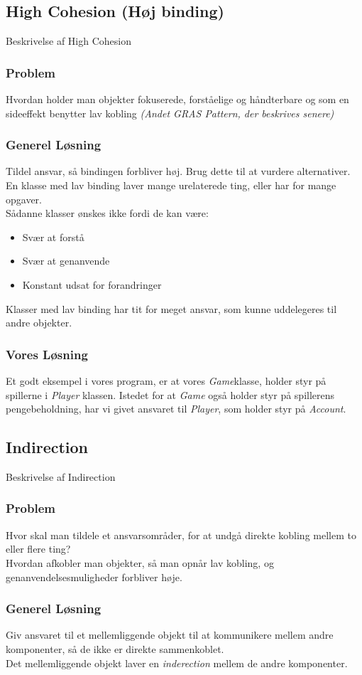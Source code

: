 \subsection{High Cohesion (Høj binding)}
Beskrivelse af High Cohesion
\subsubsection*{Problem}
Hvordan holder man objekter fokuserede, forståelige og håndterbare og som en sideeffekt benytter lav kobling \textit{(Andet GRAS Pattern, der beskrives senere)}
\subsubsection*{Generel Løsning}
Tildel ansvar, så bindingen forbliver høj. Brug dette til at vurdere alternativer.
\\
En klasse med lav binding laver mange urelaterede ting, eller har for mange opgaver.
\\
Sådanne klasser ønskes ikke fordi de kan være:
\begin{itemize}
\item Svær at forstå
\item Svær at genanvende
\item Konstant udsat for forandringer
\end{itemize}
Klasser med lav binding har tit for meget ansvar, som kunne uddelegeres til andre objekter.
\subsubsection*{Vores Løsning}
Et godt eksempel i vores program, er at vores \textit{Game}klasse,  holder styr på spillerne i \textit{Player} klassen. Istedet for at \textit{Game} også holder styr på spillerens pengebeholdning, har vi givet ansvaret til \textit{Player}, som holder styr på \textit{Account}.
\subsection{Indirection}
Beskrivelse af Indirection
\subsubsection*{Problem}
Hvor skal man tildele et ansvarsområder, for at undgå direkte kobling mellem to eller flere ting?
\\
Hvordan afkobler man objekter, så man opnår lav kobling, og genanvendelsesmuligheder forbliver høje.
\subsubsection*{Generel Løsning}
Giv ansvaret til et mellemliggende objekt til at kommunikere mellem andre komponenter, så de ikke er direkte sammenkoblet.
\\
Det mellemliggende objekt laver en \textit{inderection} mellem de andre komponenter.
